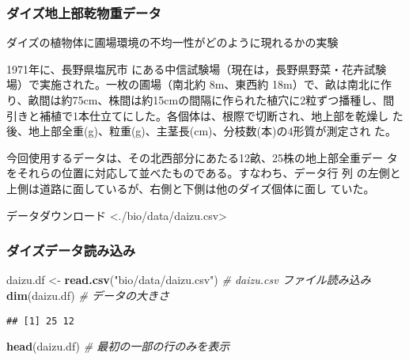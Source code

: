 \documentclass[]{article}
\author{}
\date{\vspace{-2.5em}}
\newenvironment{Shaded}{\begin{snugshade}}{\end{snugshade}}
\newcommand{\CommentTok}[1]{\textcolor[rgb]{0.56,0.35,0.01}{\textit{#1}}}
\newcommand{\KeywordTok}[1]{\textcolor[rgb]{0.13,0.29,0.53}{\textbf{#1}}}
\newcommand{\NormalTok}[1]{#1}
\newcommand{\StringTok}[1]{\textcolor[rgb]{0.31,0.60,0.02}{#1}}
\begin{document}
\hypertarget{ux30c0ux30a4ux30baux5730ux4e0aux90e8ux4e7eux7269ux91cdux30c7ux30fcux30bf}{%
\subsubsection{ダイズ地上部乾物重データ}\label{ux30c0ux30a4ux30baux5730ux4e0aux90e8ux4e7eux7269ux91cdux30c7ux30fcux30bf}}

ダイズの植物体に圃場環境の不均一性がどのように現れるかの実験

1971年に、長野県塩尻市 にある中信試験場（現在は，長野県野菜・花卉試験
場）で実施された。一枚の圃場（南北約 8m、東西約 18m）で、畝は南北に作
り、畝間は約75cm、株間は約15cmの間隔に作られた植穴に2粒ずつ播種し、間
引きと補植で1本仕立てにした。各個体は、根際で切断され、地上部を乾燥し
た後、地上部全重(g)、粒重(g)、主茎長(cm)、分枝数(本)の4形質が測定され
た。

今回使用するデータは、その北西部分にあたる12畝、25株の地上部全重デー
タをそれらの位置に対応して並べたものである。すなわち、データ行 列
の左側と上側は道路に面しているが、右側と下側は他のダイズ個体に面し
ていた。

データダウンロード \textless{}./bio/data/daizu.csv\textgreater{}

\hypertarget{ux30c0ux30a4ux30baux30c7ux30fcux30bfux8aadux307fux8fbcux307f}{%
\subsubsection{ダイズデータ読み込み}\label{ux30c0ux30a4ux30baux30c7ux30fcux30bfux8aadux307fux8fbcux307f}}

\begin{Shaded}
\begin{Highlighting}[]
\NormalTok{    daizu.df <-}\StringTok{ }\KeywordTok{read.csv}\NormalTok{(}\StringTok{"bio/data/daizu.csv"}\NormalTok{)     }\CommentTok{# daizu.csv ファイル読み込み}
    \KeywordTok{dim}\NormalTok{(daizu.df)                }\CommentTok{# データの大きさ}
\end{Highlighting}
\end{Shaded}

\begin{verbatim}
## [1] 25 12
\end{verbatim}

\begin{Shaded}
\begin{Highlighting}[]
    \KeywordTok{head}\NormalTok{(daizu.df)               }\CommentTok{# 最初の一部の行のみを表示}
\end{Highlighting}
\end{Shaded}
\end{document}
